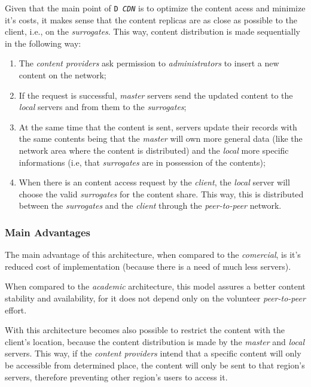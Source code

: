 \documentclass{llncs}
\begin{document}
Given that the main point of \texttt{D \textit{CDN}} is to optimize the content acess
and minimize it's costs, it makes sense that the content replicas
are as close as possible to the client, i.e., on the \emph{surrogates}.
This way, content distribution is made sequentially in the following way:
\begin{enumerate}

\item The \emph{content providers} ask permission to 
\emph{administrators} to insert a new content on the network;

\item If the request is successful, \emph{master} servers send
the updated content to the \emph{local} servers and from them to 
the \emph{surrogates};

\item At the same time that the content is sent, servers update their
records with the same contents being that the \emph{master} will own more general data
(like the network area where the content is distributed) 
and the \emph{local} more specific informations (i.e, that \emph{surrogates}
are in possession of the contents);

\item When there is an content access request by the 
\emph{client}, the \emph{local} server will choose the valid \emph{surrogates}
for the content share. This way, this is distributed between the
\emph{surrogates} and the \emph{client} through the \emph{peer-to-peer} network.
\end{enumerate}



\subsubsection{Main Advantages}

The main advantage of this architecture, when compared to the \emph{comercial},
is it's reduced cost of implementation (because there is a need 
of much less servers).

When compared to the \emph{academic} architecture, this model assures a
better content stability and availability, for it does not depend 
only on the volunteer \emph{peer-to-peer} effort. 

With this architecture becomes also possible to restrict the content
with the client's location, because the content distribution is made
by the \emph{master} and \emph{local} servers. This way, if the 
\emph{content providers} intend that a specific content will only be
accessible from determined place, the content will only be sent to
that region's servers, therefore preventing other region's users
to access it.
\end{document}
